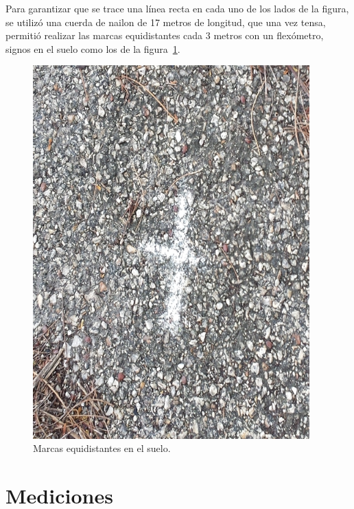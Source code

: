 Para garantizar que se trace una línea recta en cada uno de los lados de la figura, se utilizó una cuerda de nailon de 17 metros de longitud, que una vez tensa, permitió realizar las marcas equidistantes cada 3 metros con un flexómetro, signos en el suelo como los de la figura~\ref{fig:MarEq}.

\begin{figure}[H]
\centering
\includegraphics[width=0.95\textwidth]{Figures/Equid}
\caption[Marcas equidistantes en el suelo.]{Marcas equidistantes en el suelo.}
\label{fig:MarEq}
\end{figure}

\section{Mediciones}


